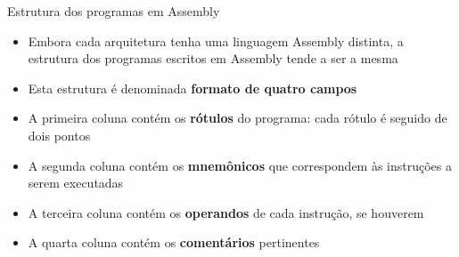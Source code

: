 \begin{frame}[fragile]{Estrutura dos programas em Assembly}

    \begin{itemize}
        \item Embora cada arquitetura tenha uma linguagem Assembly distinta, a estrutura dos 
            programas escritos em Assembly tende a ser a mesma

        \item Esta estrutura é denominada \textbf{formato de quatro campos}


        \item A primeira coluna contém os \textbf{rótulos} do programa: cada rótulo é seguido de 
            dois pontos

        \item A segunda coluna contém os \textbf{mnemônicos} que correspondem às instruções a serem
            executadas

        \item A terceira coluna contém os \textbf{operandos} de cada instrução, se houverem

        \item A quarta coluna contém os \textbf{comentários} pertinentes
    \end{itemize}

\end{frame}

